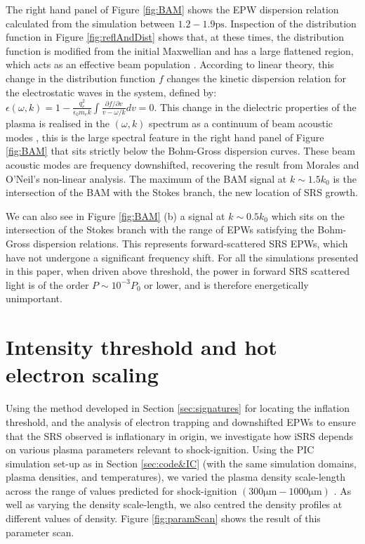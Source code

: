 The right hand panel of Figure \ref{fig:BAM} shows the EPW dispersion relation calculated from the simulation between $1.2 - 1.9
\si{\pico\second}$. Inspection of the distribution function in Figure \ref{fig:reflAndDist} shows that, at these times, the distribution
function is modified from the initial Maxwellian and has a large flattened region, which acts as an effective beam population
\cite{Yin2006}. According to  linear theory, this change in the distribution function $f$ changes the kinetic dispersion relation for the electrostatic waves in the system, defined by: $\epsilon(\omega,k) = 1 - \frac{q_e^2}{\epsilon_0m_ek}\int\frac{\partial{f}/\partial{v}}{v-\omega/k} dv = 0$.
This change in the dielectric properties of the plasma is realised in the $(\omega,k)$ spectrum as a continuum of beam acoustic
modes \cite{Yin2006}, this is the large spectral feature in the right hand panel of Figure \ref{fig:BAM} that sits strictly below
the Bohm-Gross dispersion curves.
These beam acoustic modes are frequency downshifted, recovering the result from Morales and O'Neil's non-linear analysis\cite{Morales1972}. The maximum of the BAM signal at $k \sim 1.5k_0$ is the intersection of the BAM with the Stokes
branch, the new location of SRS growth.

We can also see in Figure \ref{fig:BAM} (b) a signal at $k\sim 0.5k_0$ which sits on the intersection of the Stokes branch with the range of EPWs satisfying the Bohm-Gross dispersion relations. This represents forward-scattered SRS EPWs, which have not undergone a significant frequency shift. For all the simulations presented in this paper, when driven above threshold, the power in forward SRS scattered light is of the order $P \sim 10^{-3} P_0$ or lower, and is therefore energetically unimportant.


\section{Intensity threshold and hot electron scaling}\label{sec:paramScan}
Using the method developed in Section \ref{sec:signatures} for locating the inflation threshold, and the analysis of electron trapping and downshifted EPWs to ensure that the SRS observed is inflationary in origin, we investigate how iSRS depends on various plasma parameters relevant to shock-ignition. Using the PIC simulation set-up as in Section \ref{sec:code&IC} (with the same simulation domains, plasma densities, and temperatures), we varied the plasma density scale-length across the range
of values predicted for shock-ignition $(300\si{\micro\metre} - 1000\si{\micro\metre})$ \cite{Ribeyre2009}. As well as varying the density scale-length, we also centred the density profiles at different values of density. Figure \ref{fig:paramScan} shows the result of this parameter scan.

